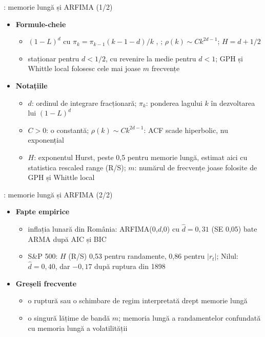 \begin{frame}{: memorie lungă și ARFIMA (1/2)}
\itemsize{\footnotesize}
\begin{itemize}
    \item \textbf{Formule-cheie}
    \begin{itemize}
        \item $(1 - L)^d$ cu $\pi_k = \pi_{k-1}(k - 1 - d)/k$ , ; $\rho(k) \sim Ck^{2d-1}$; $H = d + 1/2$
        \item staționar pentru $d < 1/2$, cu revenire la medie pentru $d < 1$; GPH și Whittle local folosesc cele mai joase $m$ frecvențe
    \end{itemize}
    \item \textbf{Notațiile}
    \begin{itemize}
        \item $d$: ordinul de integrare fracționară; $\pi_k$: ponderea lagului $k$ în dezvoltarea lui $(1 - L)^d$
        \item $C > 0$: o constantă; $\rho(k) \sim Ck^{2d-1}$: ACF scade hiperbolic, nu exponențial
        \item $H$: exponentul Hurst, peste 0,5 pentru memorie lungă, estimat aici cu statistica rescaled range (R/S); $m$: numărul de frecvențe joase folosite de GPH și Whittle local
    \end{itemize}
\end{itemize}
\end{frame}

\begin{frame}{: memorie lungă și ARFIMA (2/2)}
\itemsize{\footnotesize}
\begin{itemize}
    \item \textbf{Fapte empirice}
    \begin{itemize}
        \item inflația lunară din România: ARFIMA(0,$d$,0) cu $\hat d = 0{,}31$ (SE 0{,}05) bate ARMA după AIC și BIC
        \item S\&P 500: $H$ (R/S) 0{,}53 pentru randamente, 0{,}86 pentru $|r_t|$; Nilul: $\hat d = 0{,}40$, dar $\ensuremath{-}0{,}17$ după ruptura din 1898
    \end{itemize}
    \item \textbf{Greșeli frecvente}
    \begin{itemize}
        \item o ruptură sau o schimbare de regim interpretată drept memorie lungă
        \item o singură lățime de bandă $m$; memoria lungă a randamentelor confundată cu memoria lungă a volatilității
    \end{itemize}
\end{itemize}
\end{frame}

